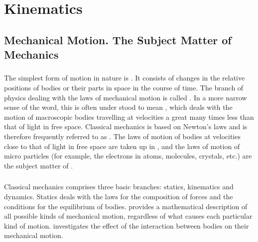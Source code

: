 

\chapter{Kinematics}
\label{ch-01}

\section{Mechanical Motion. The Subject Matter of Mechanics}
\label{sec-1.1}
\subsection{}\label{1.1.1} The simplest form of motion in nature is . It consists of changes in the relative positions of bodies or their parts in space in the course of time. The branch of phys­ics dealing with the laws of mechanical motion is called . In a more narrow sense of the word, this is often under­ stood to mean , which deals with the motion of macroscopic bodies travelling at velocities a great many times less than that of light in free space. Classical mechanics is based on Newton's laws and is therefore frequently referred to as . The laws of motion of bodies at velocities close to that of light in free space are taken up in  , and the laws of motion of micro­ particles (for example, the electrons in atoms, molecules, crystals, etc.) are the subject matter of  . 

\subsection{}\label{1.1.2}Classical mechanics comprises three basic branches: sta­tics, kinematics and dynamics. Statics deals with the laws for the composition of forces and the conditions for the equilibrium of bodies.  provides a mathematical description of all possible kinds of mechanical motion, regardless of what causes each particular kind of motion.  investigates the effect of the interaction between bodies on their mechanical motion. 

